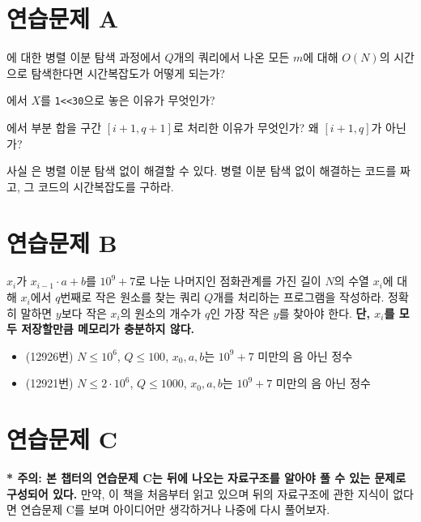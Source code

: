 \section{연습문제 A}
\begin{problem} \label{pb: wrong-pbs-time}
    에 대한 병렬 이분 탐색 과정에서 $Q$개의 쿼리에서 나온 모든 $m$에 대해 $O(N)$의 시간으로 탐색한다면 시간복잡도가 어떻게 되는가?
\end{problem}
\begin{problem}
    에서 $X$를 \texttt{1<<30}으로 놓은 이유가 무엇인가?
\end{problem}
\begin{problem}
    에서 부분 합을 구간 $[i+1, q+1]$로 처리한 이유가 무엇인가? 왜 $[i+1, q]$가 아닌가?
\end{problem}
\begin{problem}
    사실 은 병렬 이분 탐색 없이 해결할 수 있다. 병렬 이분 탐색 없이 해결하는 코드를 짜고, 그 코드의 시간복잡도를 구하라.
\end{problem}

\section{연습문제 B}

\begin{problem}
    $x_i$가 $x_{i-1} \cdot a + b$를 $10^9+7$로 나눈 나머지인 점화관계를 가진 길이 $N$의 수열 $x_i$에 대해 $x_i$에서 $q$번째로 작은 원소를 찾는 쿼리 $Q$개를 처리하는 프로그램을 작성하라. 정확히 말하면 $y$보다 작은 $x_i$의 원소의 개수가 $q$인 가장 작은 $y$를 찾아야 한다. \textbf{단, $x_i$를 모두 저장할만큼 메모리가 충분하지 않다.}
    \begin{itemize}
        \item (12926번) $N \leq 10^6$, $Q \leq 100$, $x_0, a, b$는 $10^9+7$ 미만의 음 아닌 정수
        \item (12921번) $N \leq 2 \cdot 10^6$, $Q \leq 1000$, $x_0, a, b$는 $10^9+7$ 미만의 음 아닌 정수
    \end{itemize}
\end{problem}

\section{연습문제 C}
\textbf{* 주의: 본 챕터의 연습문제 C는 뒤에 나오는 자료구조를 알아야 풀 수 있는 문제로 구성되어 있다.} 만약, 이 책을 처음부터 읽고 있으며 뒤의 자료구조에 관한 지식이 없다면 연습문제 C를 보며 아이디어만 생각하거나 나중에 다시 풀어보자.

